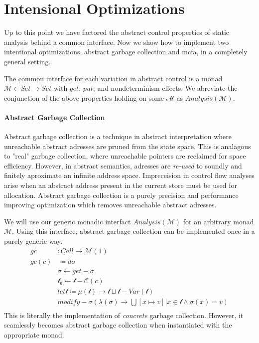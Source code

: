 \documentclass{article}
\begin{document}
\section{Intensional Optimizations}
\label{section:IntensionalOptimizations}

Up to this point we have factored the abstract control properties of static analysis behind a common interface.  
Now we show how to implement two intentional optimizations, abstract garbage collection and mcfa, in a completely general setting.

The common interface for each variation in abstract control is a monad $ℳ  ∈ Set → Set$ with $get$, $put$, and nondeterminism effects.
We abreviate the conjunction of the above properties holding on some ℳ  as $Analysis(ℳ )$.

\paragraph{Abstract Garbage Collection}
Abstract garbage collection is a technique in abstract interpretation where unreachable abstract adresses are pruned from the state space.
This is analagous to "real" garbage collection, where unreachable pointers are reclaimed for space efficiency.
However, in abstract semantics, adresses are \emph{re-used} to soundly and finitely aproximate an infinite address space.
Impreceision in control flow analyses arise when an abstract address present in the current store must be used for allocation.
Abstract garbage collection is a purely precision and performance improving optimization which removes unreachable abstract adresses.

We will use our generic monadic interfact $Analysis(ℳ )$ for an arbitrary monad $ℳ $.
Using this interface, abstract garbage collection can be implemented once in a purely generic way.
\begin{align*}
gc    &: Call → ℳ (1)                                      \\
gc(c) &≔ do                                                \\
      &σ ← get-σ                                           \\
      &𝓉₀ ← 𝓉-𝒞(c)                                         \\
      &let 𝓉 ≔ μ(𝓉) → 𝓉 ⊔ 𝓉-Var(𝓉)                         \\
      &modify-σ (λ(σ) → ⋃ { [x ↦ v] | x ∈ 𝓉 ∧ σ(x) = v } ) \\
\end{align*}
This is literally the implementation of \emph{concrete} garbage collection.
However, it seamlessly becomes abstract garbage collection when instantiated with the appropriate monad.
\end{document}
